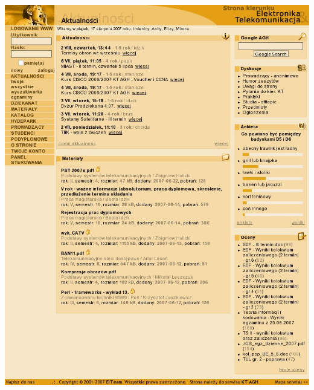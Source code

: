 \documentclass{beamer}
\begin{document}
\begin{frame}
\begin{columns}
{\begin{center}
      \includegraphics[scale=0.2]{eit.jpg}
    \end{center}
    }
  \end{columns}
\end{frame}
\section{}
\begin{frame}
  \begin{center}
  \huge
  \newline
  \normalsize
  \end{center}
\end{frame}
\end{document}
